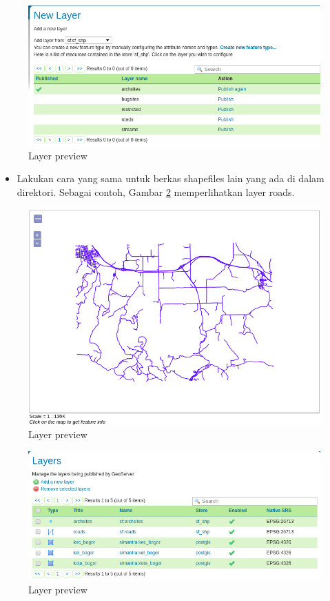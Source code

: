 \documentclass[]{book}
\providecommand{\tightlist}{%
  \setlength{\itemsep}{0pt}\setlength{\parskip}{0pt}}
\begin{document}
\begin{figure}

{\centering \includegraphics[width=0.6\linewidth]{images/08/gs20} 

}

\caption{Layer preview}\label{fig:gs20}
\end{figure}

\begin{itemize}
\tightlist
\item
  Lakukan cara yang sama untuk berkas shapefiles lain yang ada di dalam direktori. Sebagai contoh, Gambar \ref{fig:gs21} memperlihatkan layer roads.
\end{itemize}

\begin{figure}

{\centering \includegraphics[width=0.6\linewidth]{images/08/gs21} 

}

\caption{Layer preview}\label{fig:gs21}
\end{figure}

\begin{figure}

{\centering \includegraphics[width=0.6\linewidth]{images/08/gs22} 

}

\caption{Layer preview}\label{fig:gs22}
\end{figure}
\end{document}
